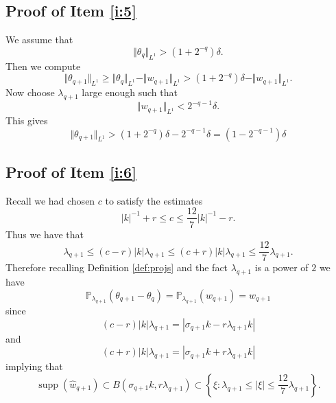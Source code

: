 \documentclass[12pt,reqno,letterpaper]{amsart}
\numberwithin{equation}{section}
\newcommand{\1}{{\bf 1}}
\newcommand{\2}{{\bf 2}}
\theoremstyle{remark}
\theoremstyle{remark}
\begin{document}
\subsection{Proof of Item \ref{i:5}}
We assume that
$$
\Vert \theta_q \Vert_{L^1} > (1 + 2^{-q})\delta.
$$
Then we compute
$$
\Vert \theta_{q+1} \Vert_{L^1} \geq \Vert \theta_q \Vert_{L^1} - \Vert w_{q+1} \Vert_{L^1} > (1 + 2^{-q})\delta - \Vert w_{q+1} \Vert_{L^1}.
$$
Now choose $\lambda_{q+1}$ large enough such that
\begin{equation}\label{eq:delta_est}
    \Vert w_{q+1} \Vert_{L^1} < 2^{-q-1}\delta.
\end{equation}
This gives
$$
\Vert \theta_{q+1} \Vert_{L^1} > (1 + 2^{-q})\delta - 2^{-q-1}\delta = (1-2^{-q-1})\delta
$$









\subsection{Proof of Item \ref{i:6}}
Recall we had chosen $c$ to satisfy the estimates
$$
|k|^{-1} + r \leq c \leq \frac{12}{7}|k|^{-1} - r.
$$
Thus we have that
$$
\lambda_{q+1} \leq (c-r)|k|\lambda_{q+1} \leq (c+r)|k|\lambda_{q+1} \leq \frac{12}{7}\lambda_{q+1}.
$$
Therefore recalling Definition \ref{def:projs} and the fact $\lambda_{q+1}$ is a power of $2$ we have
$$
\mathbb{P}_{\lambda_{q+1}}(\theta_{q+1} - \theta_q) = \mathbb{P}_{\lambda_{q+1}}(w_{q+1}) = w_{q+1}
$$
since
$$
(c-r)|k|\lambda_{q+1} = |\sigma_{q+1}k - r\lambda_{q+1}k|
$$
and
$$
(c+r)|k|\lambda_{q+1} = |\sigma_{q+1}k + r\lambda_{q+1}k|
$$
implying that
$$
\operatorname{supp}(\hat{w}_{q+1}) \subset B(\sigma_{q+1}k,r\lambda_{q+1}) \subset \left\{\xi : \lambda_{q+1} \leq |\xi| \leq \frac{12}{7}\lambda_{q+1}\right\}.
$$
\end{document}
